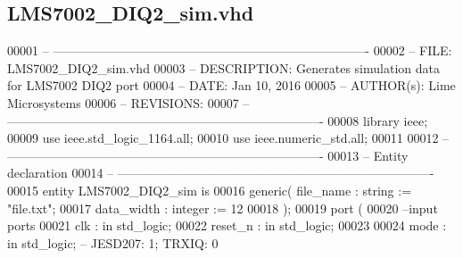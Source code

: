 \subsection{L\+M\+S7002\+\_\+\+D\+I\+Q2\+\_\+sim.\+vhd}
\label{LMS7002__DIQ2__sim_8vhd_source}

\begin{DoxyCode}
00001 \textcolor{keyword}{-- ---------------------------------------------------------------------------- }
00002 \textcolor{keyword}{-- FILE:    LMS7002\_DIQ2\_sim.vhd}
00003 \textcolor{keyword}{-- DESCRIPTION: Generates simulation data for LMS7002 DIQ2 port}
00004 \textcolor{keyword}{-- DATE:    Jan 10, 2016}
00005 \textcolor{keyword}{-- AUTHOR(s):   Lime Microsystems}
00006 \textcolor{keyword}{-- REVISIONS:}
00007 \textcolor{keyword}{-- ---------------------------------------------------------------------------- }
00008 \textcolor{vhdlkeyword}{library }\textcolor{keywordflow}{ieee};
00009 \textcolor{vhdlkeyword}{use }ieee.std\_logic\_1164.\textcolor{keywordflow}{all};
00010 \textcolor{vhdlkeyword}{use }ieee.numeric\_std.\textcolor{keywordflow}{all};
00011 
00012 \textcolor{keyword}{-- ----------------------------------------------------------------------------}
00013 \textcolor{keyword}{-- Entity declaration}
00014 \textcolor{keyword}{-- ----------------------------------------------------------------------------}
00015 \textcolor{keywordflow}{entity }LMS7002_DIQ2_sim \textcolor{keywordflow}{is}
00016     \textcolor{keywordflow}{generic}\textcolor{vhdlchar}{(} \textcolor{vhdlchar}{file_name}  \textcolor{vhdlchar}{:} \textcolor{comment}{string} \textcolor{vhdlchar}{:=} \textcolor{keyword}{"file.txt"};
00017                 \textcolor{vhdlchar}{data_width}  \textcolor{vhdlchar}{:} \textcolor{comment}{integer}   \textcolor{vhdlchar}{:=} \textcolor{vhdllogic}{}\textcolor{vhdllogic}{12} 
00018     \textcolor{vhdlchar}{)};
00019     \textcolor{keywordflow}{port} \textcolor{vhdlchar}{(}
00020 \textcolor{keyword}{      --input ports }
00021       \textcolor{vhdlchar}{clk}           \textcolor{vhdlchar}{:} \textcolor{keywordflow}{in} \textcolor{comment}{std\_logic};
00022       \textcolor{vhdlchar}{reset_n}       \textcolor{vhdlchar}{:} \textcolor{keywordflow}{in} \textcolor{comment}{std\_logic};
00023 
00024         \textcolor{vhdlchar}{mode}            \textcolor{vhdlchar}{:} \textcolor{keywordflow}{in} \textcolor{comment}{std\_logic};\textcolor{keyword}{ -- JESD207: 1; TRXIQ: 0}

\end{DoxyCode}
